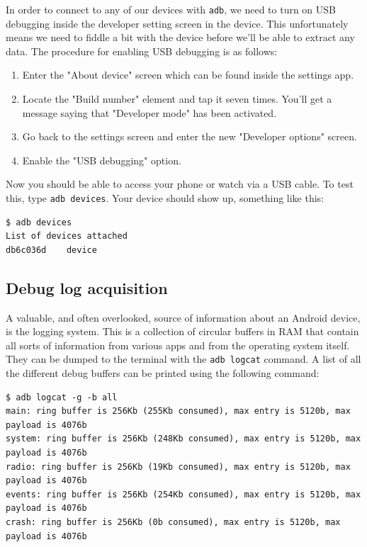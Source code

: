 \documentclass[a4paper,11pt,dvips]{article}
\begin{document}
In order to connect to any of our devices with \texttt{adb}, we need to turn on USB debugging inside the developer setting screen in the device. This unfortunately means we need to fiddle a bit with the device before we'll be able to extract any data. The procedure for enabling USB debugging is as follows:

\begin{enumerate}
\item Enter the "About device" screen which can be found inside the settings app.
\item Locate the "Build number" element and tap it seven times. You'll get a message saying that "Developer mode" has been activated.
\item Go back to the settings screen and enter the new "Developer options" screen.
\item Enable the "USB debugging" option.
\end{enumerate}

\noindent
Now you should be able to access your phone or watch via a USB cable. To test this, type \texttt{adb devices}. Your device should show up, something like this:

\scriptsize
\begin{verbatim}
$ adb devices
List of devices attached
db6c036d	device
\end{verbatim}
\normalsize


\subsection{Debug log acquisition}

A valuable, and often overlooked, source of information about an Android device, is the logging system. This is a collection of circular buffers in RAM that contain all sorts of information from various apps and from the operating system itself. They can be dumped to the terminal with the \texttt{adb logcat} command. A list of all the different debug buffers can be printed using the following command:

\scriptsize
\begin{verbatim}
$ adb logcat -g -b all
main: ring buffer is 256Kb (255Kb consumed), max entry is 5120b, max payload is 4076b
system: ring buffer is 256Kb (248Kb consumed), max entry is 5120b, max payload is 4076b
radio: ring buffer is 256Kb (19Kb consumed), max entry is 5120b, max payload is 4076b
events: ring buffer is 256Kb (254Kb consumed), max entry is 5120b, max payload is 4076b
crash: ring buffer is 256Kb (0b consumed), max entry is 5120b, max payload is 4076b
\end{verbatim}
\normalsize
\end{document}
